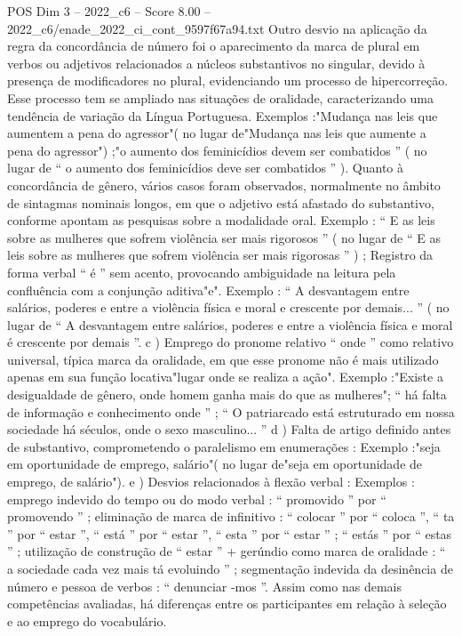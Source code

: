 \begin{textsample}{POS Dim 3 – 2022\_c6 – Score 8.00 – 2022\_c6/enade\_2022\_ci\_cont\_9597f67a94.txt}
Outro desvio na aplicação da regra da concordância de número foi o aparecimento da marca de plural em verbos ou adjetivos relacionados a núcleos substantivos no singular, devido à presença de modificadores no plural, evidenciando um processo de hipercorreção.
Esse processo tem se ampliado nas situações de oralidade, caracterizando uma tendência de variação da Língua Portuguesa.
Exemplos :"Mudança nas leis que aumentem a pena do agressor"( no lugar de"Mudança nas leis que aumente a pena do agressor") ;"o aumento dos feminicídios devem ser combatidos ” ( no lugar de “ o aumento dos feminicídios deve ser combatidos ” ).
Quanto à concordância de gênero, vários casos foram observados, normalmente no âmbito de sintagmas nominais longos, em que o adjetivo está afastado do substantivo, conforme apontam as pesquisas sobre a modalidade oral.
Exemplo : “ E as leis sobre as mulheres que sofrem violência ser mais rigorosos ” ( no lugar de “ E as leis sobre as mulheres que sofrem violência ser mais rigorosas ” ) ; Registro da forma verbal “ é ” sem acento, provocando ambiguidade na leitura pela confluência com a conjunção aditiva"e".
Exemplo : “ A desvantagem entre salários, poderes e entre a violência física e moral e crescente por demais... ” ( no lugar de “ A desvantagem entre salários, poderes e entre a violência física e moral é crescente por demais ”. c ) Emprego do pronome relativo “ onde ” como relativo universal, típica marca da oralidade, em que esse pronome não é mais utilizado apenas em sua função locativa"lugar onde se realiza a ação".
Exemplo :"Existe a desigualdade de gênero, onde homem ganha mais do que as mulheres"; “ há falta de informação e conhecimento onde ” ; “ O patriarcado está estruturado em nossa sociedade há séculos, onde o sexo masculino... ” d ) Falta de artigo definido antes de substantivo, comprometendo o paralelismo em enumerações : Exemplo :"seja em oportunidade de emprego, salário"( no lugar de"seja em oportunidade de emprego, de salário"). e ) Desvios relacionados à flexão verbal : Exemplos : emprego indevido do tempo ou do modo verbal : “ promovido ” por “ promovendo ” ; eliminação de marca de infinitivo : “ colocar ” por “ coloca ”, “ ta ” por “ estar ”, “ está ” por “ estar ”, “ esta ” por “ estar ” ; “ estás ” por “ estas ” ; utilização de construção de “ estar ” + gerúndio como marca de oralidade : “ a sociedade cada vez mais tá evoluindo ” ; segmentação indevida da desinência de número e pessoa de verbos : “ denunciar -mos ”.
Assim como nas demais competências avaliadas, há diferenças entre os participantes em relação à seleção e ao emprego do vocabulário.

\end{textsample}
